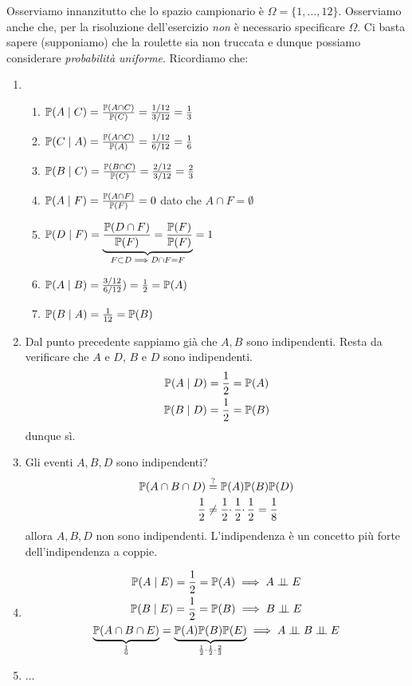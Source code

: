 Osserviamo innanzitutto che lo spazio campionario è $\Omega =\{1,\dots,12\}$. Osserviamo anche che, per la risoluzione dell'esercizio \textit{non} è necessario specificare $\Omega $. Ci basta sapere (supponiamo) che la roulette sia non truccata e dunque possiamo considerare \textit{probabilità uniforme}. Ricordiamo che:
\begin{enumerate}
	\item 
	\begin{enumerate}
		\item $\mathbb{P}(A\mid C) =\frac{\mathbb{P}(A\cap C)}{\mathbb{P}(C)} =\frac{1/12}{3/12} =\frac{1}{3}$
		\item $\mathbb{P}(C\mid A) =\frac{\mathbb{P}(A\cap C)}{\mathbb{P}(A)} =\frac{1/12}{6/12} =\frac{1}{6}$
		\item $\mathbb{P}(B\mid C) =\frac{\mathbb{P}(B\cap C)}{\mathbb{P}(C)} =\frac{2/12}{3/12} =\frac{2}{3}$
		\item $\mathbb{P}(A\mid F) =\frac{\mathbb{P}(A\cap F)}{\mathbb{P}(F)} =0$ dato che $A\cap F=\emptyset $
		\item $\mathbb{P}(D\mid F) =\underbrace{\frac{\mathbb{P}(D\cap F)}{\mathbb{P}(F)} =\frac{\mathbb{P}(F)}{\mathbb{P}(F)}}_{F\subset D\implies D\cap F=F} =1$
		\item $\mathbb{P}(A\mid B) =\frac{3/12}{6/12}) =\frac{1}{2} =\mathbb{P}(A)$
		\item $\mathbb{P}(B\mid A) =\frac{1}{12} =\mathbb{P}(B)$
	\end{enumerate}
	\item Dal punto precedente sappiamo già che $A,B$ sono indipendenti. Resta da verificare che $A$ e $D$, $B$ e $D$ sono indipendenti.
	\begin{gather*}
		\mathbb{P}(A\mid D) =\frac{1}{2} =\mathbb{P}(A)\\
		\mathbb{P}(B\mid D) =\frac{1}{2} =\mathbb{P}(B)
	\end{gather*}
	dunque sì.
	\item Gli eventi $A,B,D$ sono indipendenti?
	\begin{align*}
		\mathbb{P}(A\cap B\cap D) & \overset{?}{=} \mathbb{P}(A)\mathbb{P}(B)\mathbb{P}(D)\\
		\frac{1}{2} & \neq \frac{1}{2} \cdotp \frac{1}{2} \cdotp \frac{1}{2} =\frac{1}{8}
	\end{align*}
	allora $A,B,D$ non sono indipendenti. L'indipendenza è un concetto più forte dell'indipendenza a coppie.
	\item
	\begin{gather*}
		\PP(A\mid E) =\frac{1}{2} =\PP(A) \implies A\indep E\\
		\PP(B\mid E) =\frac{1}{2} =\PP(B) \implies B\indep E\\
		\underbrace{\PP(A\cap B\cap E)}_{\frac{1}{6}} =\underbrace{\PP(A)\PP(B)\PP(E)}_{\frac{1}{2} \cdotp \frac{1}{2} \cdotp \frac{2}{3}} \implies A\indep B\indep E
	\end{gather*}
	\item $\dots$
\end{enumerate}

